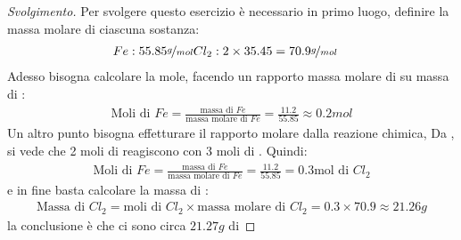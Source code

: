 \begin{proof}[Svolgimento]
  Per svolgere questo esercizio è necessario in primo luogo, definire la massa molare di ciascuna sostanza:
  \begin{eqnarray*}
    Fe: 55.85\nicefrac{g}{mol} & Cl_2:2\times 35.45=70.9\nicefrac{g}{mol}
  \end{eqnarray*}
  Adesso bisogna calcolare la mole, facendo un rapporto massa molare di  su massa di :
  \begin{eqnarray*}
    \text{Moli di } Fe=\frac{\text{massa di } Fe}{\text{massa molare di } Fe}=\frac{11.2}{55.85}\approx 0.2mol
  \end{eqnarray*}
  Un altro punto bisogna effetturare il rapporto molare dalla reazione chimica, Da , si
  vede che 2 moli di  reagiscono con 3 moli di . Quindi:
  \begin{eqnarray*}
    \text{Moli di } Fe=\frac{\text{massa di } Fe}{\text{massa molare di } Fe} = \frac{11.2}{55.85} = 0.3\text{mol di }
    Cl_2
  \end{eqnarray*}
  e in fine basta calcolare la massa di :
  \begin{eqnarray*}
    \text{Massa di } Cl_2=\text{moli di } Cl_2\times \text{massa molare di } Cl_2=0.3\times 70.9\approx 21.26g
  \end{eqnarray*}
  la conclusione è che ci sono circa $21.27g$ di 
\end{proof}
